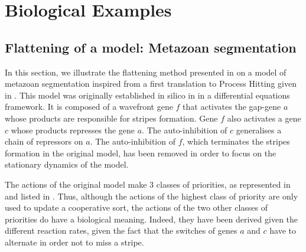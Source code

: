 
\section{Biological Examples}\label{sec:example}

\subsection{Flattening of a model: Metazoan segmentation}

In this section, we illustrate the flattening method presented in 
on a model of metazoan segmentation inspired from a first translation to Process Hitting given in \cite{PMR10-TCSB}.
This model was originally established in silico in \cite{MSB:MSB4100192} in a differential equations framework.
It is composed of a wavefront gene $f$ that activates the gap-gene $a$ whose products are responsible for stripes formation.
Gene $f$ also activates a gene $c$ whose products represses the gene $a$.
The auto-inhibition of $c$ generalises a chain of repressors on $a$.
The auto-inhibition of $f$, which terminates the stripes formation in the original model,
has been removed in order to focus on the stationary dynamics of the model.

The actions of the original model make $3$ classes of priorities, as represented in 
and listed in .
Thus, although the actions of the highest class of priority are only used to update a cooperative sort,
the actions of the two other classes of priorities do have a biological meaning.
Indeed, they have been derived given the different reaction rates,
given the fact that the switches of genes $a$ and $c$ have to alternate in order not to miss a stripe.

